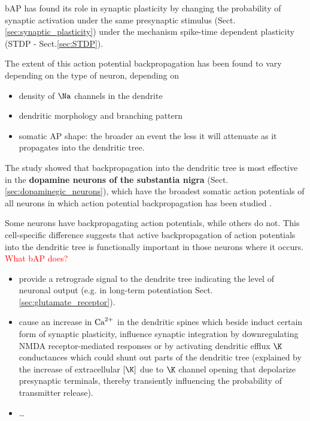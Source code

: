 bAP has found its role in synaptic plasticity by changing
the probability of synaptic activation under the same presynaptic stimulus
(Sect.\ref{sec:synaptic_plasticity}) under the mechanism spike-time dependent
plasticity (STDP - Sect.\ref{sec:STDP}).

The extent of this action potential backpropagation has been found to vary
depending on the type of neuron, depending on
\begin{itemize}
  \item density of $\Na$ channels in the dendrite
  
  \item dendritic morphology and branching pattern
  
  \item somatic AP shape: the broader an event the less it will attenuate as it
propagates into the dendritic tree.
\end{itemize}
The study showed that backpropagation into the dendritic tree is most effective
in the {\bf dopamine neurons of the substantia nigra}
(Sect.\ref{sec:dopaminegic_neurons}), which have the broadest somatic action
potentials of all neurons in which action potential backpropagation has
been studied \citep{stuart1997}.

Some neurons have backpropagating action potentials, while others do not. This
cell-specific difference suggests that active backpropagation of action
potentials into the dendritic tree is functionally important in those neurons
where it occurs. \textcolor{red}{What bAP does?}
\begin{itemize}
  \item provide a retrograde signal to the dendrite tree indicating the level of
  neuronal output (e.g. in long-term potentiation
  Sect.\ref{sec:glutamate_receptor}).
  
  \item cause an increase in ${\text{Ca}^{2+}}$ in the dendritic spines which beside induct
  certain form of synaptic plasticity, influence synaptic integration by
  downregulating NMDA receptor-mediated responses or by activating dendritic
  efflux $\K$ conductances which could shunt out parts of the dendritic tree
  (explained by the increase of extracellular $[\K]$ due to $\K$ channel opening
  that depolarize presynaptic terminals, thereby transiently influencing
the probability of transmitter release).

   \item \ldots 
\end{itemize}



